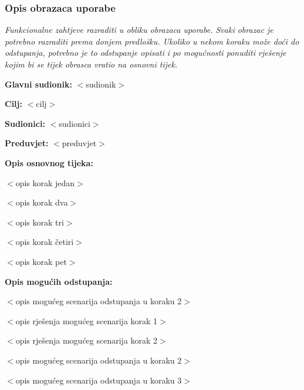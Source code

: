 				\subsubsection{Opis obrazaca uporabe}
					\textit{Funkcionalne zahtjeve razraditi u obliku obrazaca uporabe. Svaki obrazac je potrebno razraditi prema donjem predlošku. Ukoliko u nekom koraku može doći do odstupanja, potrebno je to odstupanje opisati i po mogućnosti ponuditi rješenje kojim bi se tijek obrasca vratio na osnovni tijek.}\\
					

					\noindent {}
					\begin{packed_item}
	
						\item \textbf{Glavni sudionik: }$<$sudionik$>$
						\item  \textbf{Cilj:} $<$cilj$>$
						\item  \textbf{Sudionici:} $<$sudionici$>$
						\item  \textbf{Preduvjet:} $<$preduvjet$>$
						\item  \textbf{Opis osnovnog tijeka:}
						
						\item[] \begin{packed_enum}
	
							\item $<$opis korak jedan$>$
							\item $<$opis korak dva$>$
							\item $<$opis korak tri$>$
							\item $<$opis korak četiri$>$
							\item $<$opis korak pet$>$
						\end{packed_enum}
						
						\item  \textbf{Opis mogućih odstupanja:}
						
						\item[] \begin{packed_item}
	
							\item[2.a] $<$opis mogućeg scenarija odstupanja u koraku 2$>$
							\item[] \begin{packed_enum}
								
								\item $<$opis rješenja mogućeg scenarija korak 1$>$
								\item $<$opis rješenja mogućeg scenarija korak 2$>$
								
							\end{packed_enum}
							\item[2.b] $<$opis mogućeg scenarija odstupanja u koraku 2$>$
							\item[3.a] $<$opis mogućeg scenarija odstupanja  u koraku 3$>$
							
						\end{packed_item}
					\end{packed_item}
				
